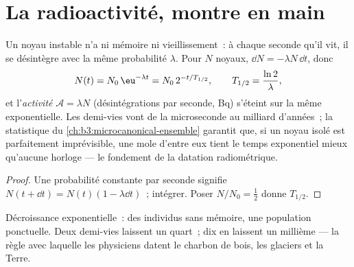 \section{La radioactivité, montre en main}

\begin{theorem}\label{thm:b3:nuclear-physics:decay}
Un noyau instable n'a ni mémoire ni vieillissement~: à chaque seconde
qu'il vit, il se désintègre avec la même probabilité $\lambda$. Pour
$N$ noyaux, $\dd N = -\lambda N\,\dd t$, donc
\[
N(t) = N_0\,\eu^{-\lambda t} = N_0\,2^{-t/T_{1/2}} ,
\qquad T_{1/2} = \frac{\ln2}{\lambda} ,
\]
et l'\emph{activité} $\mathcal A = \lambda N$ (désintégrations par
seconde, \unit{Bq}) s'éteint sur la même exponentielle. Les demi-vies
vont de la microseconde au milliard d'années~; la statistique du
\cref{ch:b3:microcanonical-ensemble} garantit que, si un noyau isolé
est parfaitement imprévisible, une mole d'entre eux tient le temps
exponentiel mieux qu'aucune horloge --- le fondement de la datation
radiométrique.
\end{theorem}

\begin{proof}
Une probabilité constante par seconde signifie $N(t + \dd t) = N(t)(1 -
\lambda\dd t)$~; intégrer. Poser $N/N_0 = \tfrac12$ donne
$T_{1/2}$.
\end{proof}

\begin{omfigure}

{\small Décroissance exponentielle~: des individus sans mémoire, une
population ponctuelle. Deux demi-vies laissent un quart~; dix en
laissent un millième --- la règle avec laquelle les physiciens datent
le charbon de bois, les glaciers et la Terre.}
\end{omfigure}

